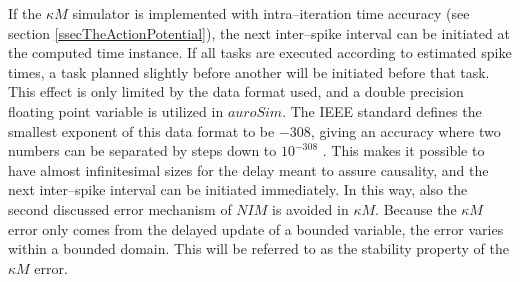		If the $\kappa M$ simulator is implemented with intra--iteration time accuracy (see section \ref{ssecTheActionPotential}), the next inter--spike interval can be initiated at the computed time instance.
		If all tasks are executed according to estimated spike times, a task planned slightly before another will be initiated before that task. %
		This effect is only limited by the data format used, and a double precision floating point variable is utilized in $auroSim$.
		The IEEE standard defines the smallest exponent of this data format to be $-308$, giving an accuracy where two numbers can be separated by steps down to $10^{-308}$ \cite{kreyszig8edKAP17}.
		This makes it possible to have almost infinitesimal sizes for the delay meant to assure causality, and the next inter--spike interval can be initiated immediately.
		In this way, also the second discussed error mechanism of $NIM$ is avoided in $\kappa M$.
		Because the $\kappa M$ error only comes from the delayed update of a bounded variable, the error varies within a bounded domain. %
 		This will be referred to as the stability property of the $\kappa M$ error.


%	
%
%
%

